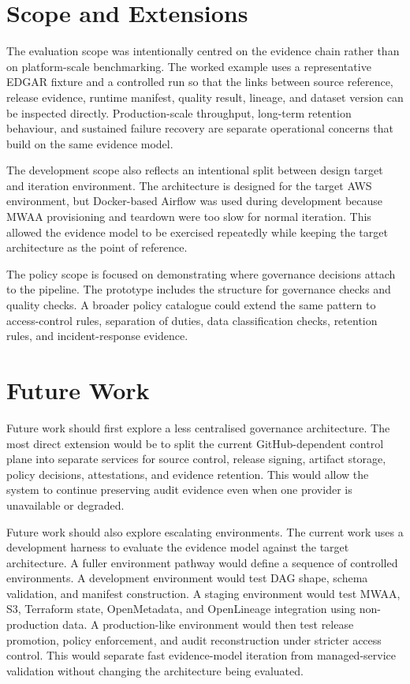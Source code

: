 \section{Scope and Extensions}
\noindent
The evaluation scope was intentionally centred on the evidence chain rather
than on platform-scale benchmarking. The worked example uses a representative
EDGAR fixture and a controlled run so that the links between source reference,
release evidence, runtime manifest, quality result, lineage, and dataset
version can be inspected directly. Production-scale throughput, long-term
retention behaviour, and sustained failure recovery are separate operational
concerns that build on the same evidence model.

The development scope also reflects an intentional split between design target
and iteration environment. The architecture is designed for the target AWS
environment, but Docker-based Airflow was used during development because MWAA
provisioning and teardown were too slow for normal iteration. This allowed the
evidence model to be exercised repeatedly while keeping the target architecture
as the point of reference.

The policy scope is focused on demonstrating where governance decisions attach
to the pipeline. The prototype includes the structure for governance checks and
quality checks. A broader policy catalogue could extend the same pattern to
access-control rules, separation of duties, data classification checks,
retention rules, and incident-response evidence.

\section{Future Work}
\noindent
Future work should first explore a less centralised governance architecture.
The most direct extension would be to split the current GitHub-dependent
control plane into separate services for source control, release signing,
artifact storage, policy decisions, attestations, and evidence retention. This
would allow the system to continue preserving audit evidence even when one
provider is unavailable or degraded.

Future work should also explore escalating environments. The current work uses
a development harness to evaluate the evidence model against the target
architecture. A fuller environment pathway would define a sequence of
controlled environments. A development environment would test DAG shape, schema
validation, and manifest construction. A staging environment would test MWAA,
S3, Terraform state, OpenMetadata, and OpenLineage integration using
non-production data. A production-like environment would then test release
promotion, policy enforcement, and audit reconstruction under stricter access
control. This would separate fast evidence-model iteration from managed-service
validation without changing the architecture being evaluated.

